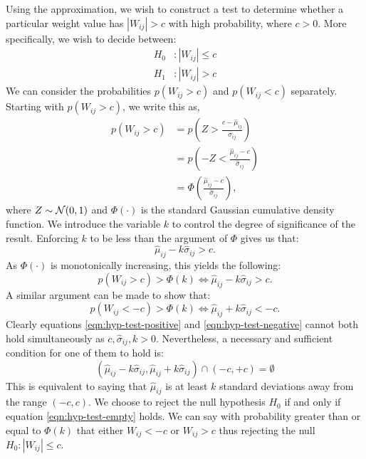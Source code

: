 Using the approximation, we wish to construct a test to determine whether a particular weight value has $|W_{ij}| > c$ with high probability, where $c>0$. More specifically, we wish to decide between:
%
\begin{equation}
	\begin{aligned}
		H_0&: |W_{ij}| \leq c \\
		H_1&: |W_{ij}| > c
	\end{aligned}
\end{equation}
%
We can consider the probabilities $p(W_{ij} > c)$ and $p(W_{ij} < c)$ separately. Starting with $p(W_{ij} > c)$, we write this as,
%
\begin{align*}
	p(W_{ij} > c) &= p\left(Z > \frac{c - \hat{\mu}_{ij}}{\hat{\sigma}_{ij}}\right) \\
	&= p\left(-Z < \frac{\hat{\mu}_{ij} - c}{\hat{\sigma}_{ij}}\right)\\
	&= \Phi\left(\frac{\hat{\mu}_{ij} - c}{\hat{\sigma}_{ij}}\right),
\end{align*}
%
where $Z \sim \mathcal{N}(0,1)$ and $\Phi(\cdot)$ is the standard Gaussian cumulative density function. We introduce the variable $k$ to control the degree of significance of the result. Enforcing $k$ to be less than the argument of $\Phi$ gives us that: 
%
\begin{equation*}
	\hat{\mu}_{ij} - k \hat{\sigma}_{ij} > c.
\end{equation*}
%
As $\Phi(\cdot)$ is monotonically increasing, this yields the following:
%
\begin{equation}
	p(W_{ij} > c) > \Phi(k) \iff \hat{\mu}_{ij} - k \hat{\sigma}_{ij} > c.
	\label{eqn:hyp-test-positive}
\end{equation}
%
A similar argument can be made to show that:
%
\begin{equation}
	p(W_{ij} < -c) > \Phi(k) \iff \hat{\mu}_{ij} + k \hat{\sigma}_{ij} < -c.
	\label{eqn:hyp-test-negative}
\end{equation}
%
Clearly equations \ref{eqn:hyp-test-positive} and \ref{eqn:hyp-test-negative} cannot both hold simultaneously as $c, \hat{\sigma}_{ij}, k>0$. Nevertheless, a necessary and sufficient condition for one of them to hold is:
%
\begin{equation}
	(\hat{\mu}_{ij} - k \hat{\sigma}_{ij}, \hat{\mu}_{ij} + k \hat{\sigma}_{ij}) \cap (-c, +c) = \emptyset
	\label{eqn:hyp-test-empty}
\end{equation}
%
This is equivalent to saying that $\hat{\mu}_{ij}$ is at least $k$ standard deviations away from the range $(-c, c)$. We choose to reject the null hypothesis $H_0$ if and only if equation \ref{eqn:hyp-test-empty} holds. We can say with probability greater than or equal to $\Phi(k)$ that either $W_{ij} < -c$ or $W_{ij} > c$ thus rejecting the null $H_0: |W_{ij}| \leq c$.

